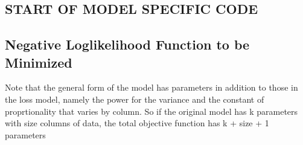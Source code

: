 \documentclass[]{article}
\newenvironment{Shaded}{\begin{snugshade}}{\end{snugshade}}
\newcommand{\ControlFlowTok}[1]{\textcolor[rgb]{0.13,0.29,0.53}{\textbf{#1}}}
\newcommand{\KeywordTok}[1]{\textcolor[rgb]{0.13,0.29,0.53}{\textbf{#1}}}
\newcommand{\NormalTok}[1]{#1}
\newcommand{\OperatorTok}[1]{\textcolor[rgb]{0.81,0.36,0.00}{\textbf{#1}}}
\newcommand{\StringTok}[1]{\textcolor[rgb]{0.31,0.60,0.02}{#1}}
\begin{document}
\hypertarget{start-of-model-specific-code}{%
\subsection{START OF MODEL SPECIFIC
CODE}\label{start-of-model-specific-code}}

\begin{Shaded}
\end{Shaded}

\hypertarget{negative-loglikelihood-function-to-be-minimized}{%
\subsection{Negative Loglikelihood Function to be
Minimized}\label{negative-loglikelihood-function-to-be-minimized}}

Note that the general form of the model has parameters in addition to
those in the loss model, namely the power for the variance and the
constant of proprtionality that varies by column. So if the original
model has k parameters with size columns of data, the total objective
function has k + size + 1 parameters
\end{document}
